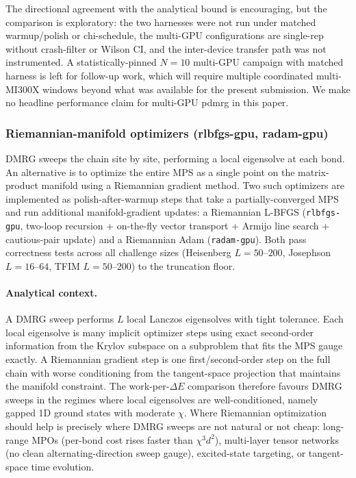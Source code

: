 \documentclass[preprint,12pt]{elsarticle}
\begin{document}
The directional agreement with the analytical bound is encouraging, but the comparison is exploratory: the two harnesses were not run under matched warmup/polish or chi-schedule, the multi-GPU configurations are single-rep without crash-filter or Wilson CI, and the inter-device transfer path was not instrumented.  A statistically-pinned $N{=}10$ multi-GPU campaign with matched harness is left for follow-up work, which will require multiple coordinated multi-MI300X windows beyond what was available for the present submission.  We make no headline performance claim for multi-GPU pdmrg in this paper.

\subsubsection{Riemannian-manifold optimizers (rlbfgs-gpu, radam-gpu)}
\label{sec:riemannian}

DMRG sweeps the chain site by site, performing a local eigensolve at each bond.  An alternative is to optimize the entire MPS as a single point on the matrix-product manifold using a Riemannian gradient method.  Two such optimizers are implemented as polish-after-warmup steps that take a partially-converged MPS and run additional manifold-gradient updates: a Riemannian L-BFGS (\texttt{rlbfgs-gpu}, two-loop recursion + on-the-fly vector transport + Armijo line search + cautious-pair update) and a Riemannian Adam (\texttt{radam-gpu}).  Both pass correctness tests across all challenge sizes (Heisenberg $L{=}50$--$200$, Josephson $L{=}16$--$64$, TFIM $L{=}50$--$200$) to the truncation floor.

\paragraph{Analytical context.}  A DMRG sweep performs $L$ local Lanczos eigensolves with tight tolerance.  Each local eigensolve is many implicit optimizer steps using exact second-order information from the Krylov subspace on a subproblem that fits the MPS gauge exactly.  A Riemannian gradient step is one first/second-order step on the full chain with worse conditioning from the tangent-space projection that maintains the manifold constraint.  The work-per-$\Delta E$ comparison therefore favours DMRG sweeps in the regimes where local eigensolves are well-conditioned, namely gapped 1D ground states with moderate $\chi$.  Where Riemannian optimization should help is precisely where DMRG sweeps are not natural or not cheap: long-range MPOs (per-bond cost rises faster than $\chi^3 d^2$), multi-layer tensor networks (no clean alternating-direction sweep gauge), excited-state targeting, or tangent-space time evolution.
\end{document}
